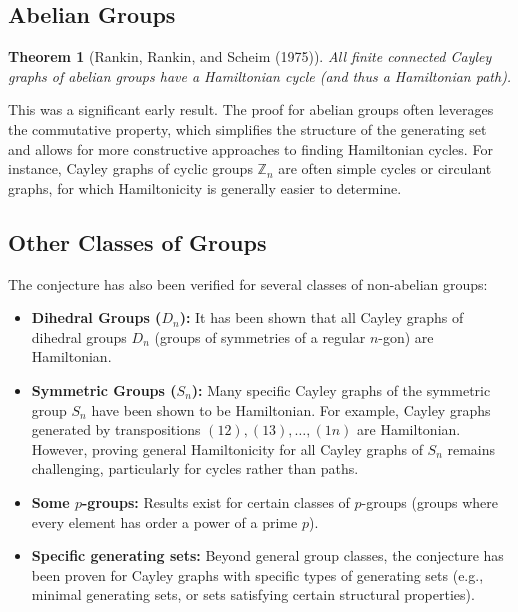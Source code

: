 \documentclass[12pt]{article}
\newtheorem{theorem}{Theorem}[section]
\theoremstyle{remark}
\begin{document}
\subsection{Abelian Groups}
\begin{theorem}[Rankin, Rankin, and Scheim (1975)]
All finite connected Cayley graphs of abelian groups have a Hamiltonian cycle (and thus a Hamiltonian path).
\end{theorem}
This was a significant early result. The proof for abelian groups often leverages the commutative property, which simplifies the structure of the generating set and allows for more constructive approaches to finding Hamiltonian cycles. For instance, Cayley graphs of cyclic groups $\mathbb{Z}_n$ are often simple cycles or circulant graphs, for which Hamiltonicity is generally easier to determine.

\subsection{Other Classes of Groups}
The conjecture has also been verified for several classes of non-abelian groups:
\begin{itemize}
    \item \textbf{Dihedral Groups ($D_n$):} It has been shown that all Cayley graphs of dihedral groups $D_n$ (groups of symmetries of a regular $n$-gon) are Hamiltonian.
    \item \textbf{Symmetric Groups ($S_n$):} Many specific Cayley graphs of the symmetric group $S_n$ have been shown to be Hamiltonian. For example, Cayley graphs generated by transpositions $(12), (13), \dots, (1n)$ are Hamiltonian. However, proving general Hamiltonicity for all Cayley graphs of $S_n$ remains challenging, particularly for cycles rather than paths.
    \item \textbf{Some $p$-groups:} Results exist for certain classes of $p$-groups (groups where every element has order a power of a prime $p$).
    \item \textbf{Specific generating sets:} Beyond general group classes, the conjecture has been proven for Cayley graphs with specific types of generating sets (e.g., minimal generating sets, or sets satisfying certain structural properties).
\end{itemize}
\end{document}
